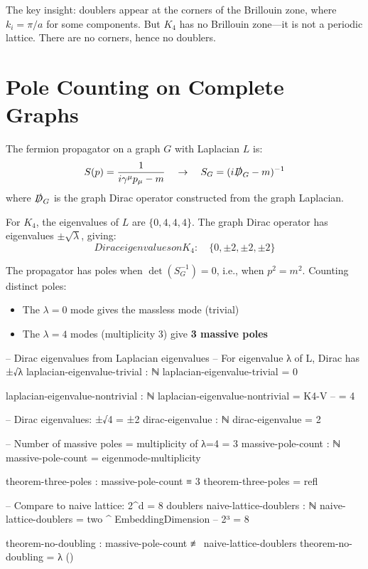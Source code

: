 \documentclass[11pt,a4paper]{book}
\def\text#1{#1}%
\begin{document}
The key insight: doublers appear at the corners of the Brillouin zone, where $k_i = \pi/a$ for some components. But $K_4$ has no Brillouin zone---it is not a periodic lattice. There are no corners, hence no doublers.

\section{Pole Counting on Complete Graphs}

The fermion propagator on a graph $G$ with Laplacian $L$ is:
\[
S(p) = \frac{1}{i\gamma^\mu p_\mu - m} \quad \to \quad S_G = (i\slashed{D}_G - m)^{-1}
\]
where $\slashed{D}_G$ is the graph Dirac operator constructed from the graph Laplacian.

For $K_4$, the eigenvalues of $L$ are $\{0, 4, 4, 4\}$. The graph Dirac operator has eigenvalues $\pm\sqrt{\lambda}$, giving:
\[
\text{Dirac eigenvalues on } K_4: \quad \{0, \pm 2, \pm 2, \pm 2\}
\]

The propagator has poles when $\det(S_G^{-1}) = 0$, i.e., when $p^2 = m^2$. Counting distinct poles:
\begin{itemize}
\item The $\lambda = 0$ mode gives the massless mode (trivial)
\item The $\lambda = 4$ modes (multiplicity 3) give \textbf{3 massive poles}
\end{itemize}

\begin{code}
-- Dirac eigenvalues from Laplacian eigenvalues
-- For eigenvalue λ of L, Dirac has ±√λ
laplacian-eigenvalue-trivial : ℕ
laplacian-eigenvalue-trivial = 0

laplacian-eigenvalue-nontrivial : ℕ
laplacian-eigenvalue-nontrivial = K4-V  -- = 4

-- Dirac eigenvalues: ±√4 = ±2
dirac-eigenvalue : ℕ
dirac-eigenvalue = 2

-- Number of massive poles = multiplicity of λ=4 = 3
massive-pole-count : ℕ
massive-pole-count = eigenmode-multiplicity

theorem-three-poles : massive-pole-count ≡ 3
theorem-three-poles = refl

-- Compare to naive lattice: 2^d = 8 doublers
naive-lattice-doublers : ℕ
naive-lattice-doublers = two ^ EmbeddingDimension  -- 2³ = 8

theorem-no-doubling : massive-pole-count ≢ naive-lattice-doublers
theorem-no-doubling = λ ()
\end{code}
\end{document}
